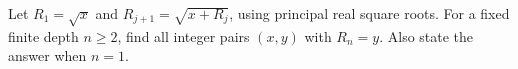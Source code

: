 Let $R_1=\sqrt{x}$ and $R_{j+1}=\sqrt{x+R_j}$, using principal real square roots. For a fixed finite depth $n\ge2$, find all integer pairs $(x,y)$ with $R_n=y$. Also state the answer when $n=1$.

